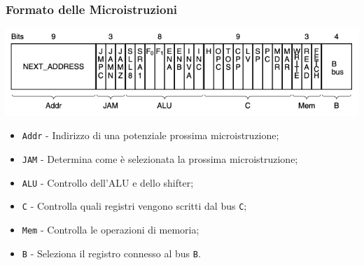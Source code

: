 \documentclass{beamer}
\begin{document}
\begin{frame}
  \frametitle{Formato delle Microistruzioni}
  \begin{center}
    \includegraphics[width=\textwidth]{mu_instr_small.png}
  \end{center}
\begin{itemize}
  \item \lstinline{Addr} - Indirizzo di una potenziale prossima microistruzione;
  \item \lstinline{JAM} - Determina come è selezionata la prossima
  microistruzione;
  \item \lstinline{ALU} - Controllo dell'ALU e dello shifter;
  \item \lstinline{C} - Controlla quali registri vengono scritti dal bus
  \lstinline{C};
  \item \lstinline{Mem} - Controlla le operazioni di memoria;
  \item \lstinline{B} - Seleziona il registro connesso al bus \lstinline{B}.
\end{itemize}
\end{frame}
\end{document}

